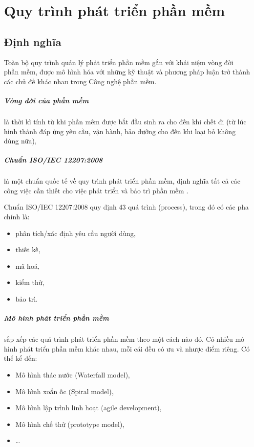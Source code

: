 \chapter{Quy trình phát triển phần mềm}
    \section{Định nghĩa}
        Toàn bộ quy trình quản lý phát triển phần mềm gắn với khái niệm vòng đời phần mềm, được mô hình hóa với những kỹ thuật và phương pháp luận trở thành các chủ đề khác nhau trong Công nghệ phần mềm.

        \paragraph{Vòng đời của phần mềm} là thời kì tính từ khi phần mêm được
        bắt đầu sinh ra cho đến khi chết đi (từ lúc hình thành đáp ứng yêu cầu,
        vận hành, bảo dưỡng cho đến khi loại bỏ không dùng nữa),

        \paragraph{Chuẩn ISO/IEC 12207:2008} là một chuẩn quốc tế về quy trình phát triển phần
        mềm, định nghĩa tất cả các công việc cần thiết cho việc phát triển và
        bảo trì phần mềm \cite{ISOWiki}.

        Chuẩn ISO/IEC 12207:2008 quy định 43 quá trình (process), trong đó có
        các pha chính là: 
            \begin{itemize}
                \item phân tích/xác định yêu cầu người dùng, 
                \item thiết kế, 
                \item mã hoá, 
                \item kiểm thử, 
                \item bảo trì.
            \end{itemize}

        \paragraph{Mô hình phát triển phần mềm} sắp xếp các quá trình phát
        triển phần mềm theo một cách nào đó. Có nhiều mô hình phát triển phần
        mềm khác nhau, mỗi cái đều có ưu và nhược điểm riêng. Có thể kể đến:
        \begin{itemize}
            \item Mô hình thác nước (Waterfall model),
            \item Mô hình xoắn ốc (Spiral model),
            \item Mô hình lập trình linh hoạt (agile development),
            \item Mô hình chế thử (prototype model),
            \item \ldots
        \end{itemize}

